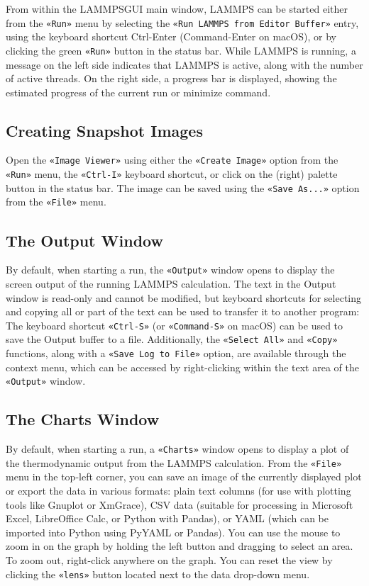 \documentclass[9pt,tutorial]{livecoms}
\newcommand{\lmpcmd}[1]{\hspace{0pt}\colorbox{listing}{\textcolor{command}{\small{#1}}}\hspace{0pt}} %
\newcommand{\guicmd}[1]{\textcolor{command}{\texttt{«#1»}}} %
\newcommand{\lammpsgui}{\textsf{LAMMPS\textendash GUI}}
\begin{document}
\begin{appendices}
From within the \lammpsgui{} main window, LAMMPS can be started either from
the \guicmd{Run} menu by selecting the \guicmd{Run LAMMPS from Editor Buffer} entry,
using the keyboard shortcut Ctrl-Enter (Command-Enter on macOS), or by clicking the
green \guicmd{Run} button in the status bar.  While LAMMPS is running, a message on
the left side indicates that LAMMPS is active, along with the number of active threads.
On the right side, a progress bar is displayed, showing the estimated progress
of the current \lmpcmd{run} or \lmpcmd{minimize} command.

\subsection{Creating Snapshot Images}

Open the \guicmd{Image Viewer} using either the \guicmd{Create Image} option
from the \guicmd{Run} menu, the \guicmd{Ctrl-I} keyboard shortcut,
or click on the (right) palette button in the status bar.  The image
can be saved using the \guicmd{Save As...} option from the \guicmd{File} menu.

\subsection{The Output Window}

By default, when starting a run, the \guicmd{Output} window opens to display the screen
output of the running LAMMPS calculation.  The text in the Output window is
read-only and cannot be modified, but keyboard shortcuts for selecting and
copying all or part of the text can be used to transfer it to another program:
The keyboard shortcut \guicmd{Ctrl-S} (or \guicmd{Command-S} on {macOS}) can
be used to save the Output buffer to a file.  Additionally, the \guicmd{Select All}
and \guicmd{Copy} functions, along with a \guicmd{Save Log to File} option, are available
through the context menu, which can be accessed by right-clicking within the text area of the
\guicmd{Output} window.

\subsection{The Charts Window}

By default, when starting a run, a \guicmd{Charts} window opens to display
a plot of the thermodynamic output from the LAMMPS calculation.  From the \guicmd{File}
menu in the top-left corner, you can save an image of the
currently displayed plot or export the data in various formats:
plain text columns (for use with plotting tools like Gnuplot or XmGrace),
CSV data (suitable for processing in Microsoft Excel, LibreOffice Calc,
or Python with Pandas), or YAML (which can be imported into Python using PyYAML or Pandas).
You can use the mouse to zoom in on the graph by holding the left button and dragging
to select an area.  To zoom out, right-click anywhere on the graph.  You can reset the view
by clicking the \guicmd{lens} button located next to the data drop-down menu.


\end{appendices}
\end{document}
